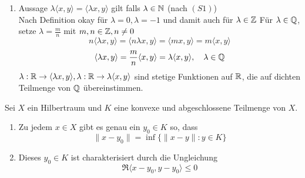 \begin{beweis}
\begin{enumerate}[label=\roman*\upshape)]
		\item Aussage $\lambda \langle x, y \rangle = \langle \lambda x, y \rangle$ gilt falls $\lambda \in \mathbb{N}$ (nach \hyperref[def:15.1i]{$(S1)$}) \\
			Nach Definition okay für $\lambda = 0, \lambda = -1$ und damit auch für $\lambda \in \mathbb{Z}$
			Für $\lambda \in \mathbb{Q}$, setze $\lambda = \frac{m}{n}$ mit $m, n \in \mathbb{Z}, n \neq 0$ 
			\[ n \langle \lambda x, y \rangle = \langle n \lambda x, y \rangle = \langle m x, y \rangle = m \langle x, y \rangle \]
			\[ \langle \lambda x, y \rangle = \frac{m}{n} \langle x, y \rangle = \lambda \langle x, y \rangle, \quad \lambda \in \mathbb{Q} \]
			$\lambda : \mathbb{R} \rightarrow \langle \lambda x, y \rangle, \lambda : \mathbb{R} \rightarrow \lambda \langle x, y \rangle$ sind stetige Funktionen auf $\mathbb{R}$, die auf dichten Teilmenge von $\mathbb{Q}$ übereinstimmen.
	\end{enumerate}
\end{beweis}


\begin{satz} \label{satz:15.7-besteApproximation}
	Sei $X$ ein Hilbertraum und $K$ eine konvexe und abgeschlossene Teilmenge von $X$.
	\begin{enumerate}[label=\alph*\upshape)]
		\item Zu jedem $x \in X$ gibt es genau ein $y_{0} \in K$ so, dass
			\[ \| x - y_{0} \| = \inf \{ \| x - y \|: y \in K \} \]
		\item Dieses $y_{0} \in K$ ist charakterisiert durch die Ungleichung 
			\[ \Re \langle x - y_{0}, y - y_{0} \rangle \leq 0 \]
	\end{enumerate}
\end{satz}

